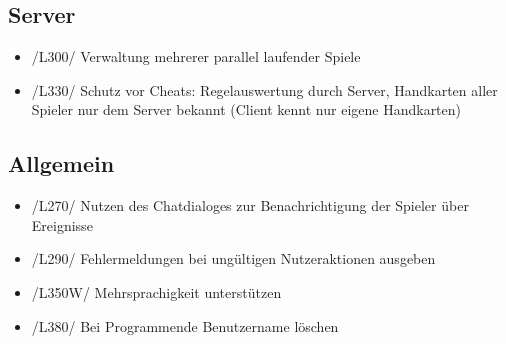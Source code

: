 \documentclass{article}
\begin{document}
\subsection{Server}
\begin{itemize}
\item /L300/ Verwaltung mehrerer parallel laufender Spiele
\item /L330/ Schutz vor Cheats: Regelauswertung durch Server, Handkarten aller Spieler nur dem Server bekannt (Client kennt nur eigene Handkarten)
\end{itemize}
	
\subsection{Allgemein}
\begin{itemize}
	\item /L270/ Nutzen des Chatdialoges zur Benachrichtigung der Spieler über Ereignisse
	\item /L290/ Fehlermeldungen bei ungültigen Nutzeraktionen ausgeben
	\item /L350W/ Mehrsprachigkeit unterstützen
	\item /L380/ Bei Programmende Benutzername löschen
\end{itemize}
	
\end{document}
